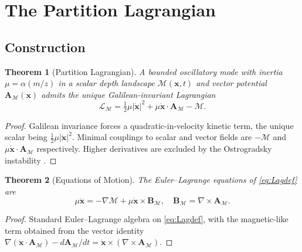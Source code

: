 \documentclass[twocolumn,10pt,a4paper]{article}
\theoremstyle{thmstyle}
\newtheorem{theorem}{Theorem}[section]
\theoremstyle{definition}
\theoremstyle{remark}
\newcommand{\Depth}{\mathcal{M}}
\newcommand{\Lagr}{\mathcal{L}}
\newcommand{\partinert}{\mu}
\newcommand{\Apartition}{\mathbf{A}_{\Depth}}
\begin{document}
\section{The Partition Lagrangian}
\label{sec:lagrangian}

\subsection{Construction}

\begin{theorem}[Partition Lagrangian]
\label{thm:Lag}
A bounded oscillatory mode with inertia $\partinert=\alpha(m/z)$ in a
scalar depth landscape $\Depth(\mathbf{x},t)$ and vector potential
$\Apartition(\mathbf{x})$ admits the unique Galilean-invariant
Lagrangian
\begin{equation}
\boxed{\;\Lagr_{\Depth}=\tfrac{1}{2}\partinert|\dot{\mathbf{x}}|^{2}
+\partinert\dot{\mathbf{x}}\cdot\Apartition-\Depth.\;}
\label{eq:Lagdef}
\end{equation}
\end{theorem}

\begin{proof}
Galilean invariance forces a quadratic-in-velocity kinetic term, the
unique scalar being $\tfrac{1}{2}\partinert|\dot{\mathbf{x}}|^{2}$.
Minimal couplings to scalar and vector fields are $-\Depth$ and
$\partinert\dot{\mathbf{x}}\cdot\Apartition$ respectively. Higher
derivatives are excluded by the Ostrogradsky instability
\citep{ostrogradsky1850}.
\end{proof}

\begin{theorem}[Equations of Motion]
\label{thm:EOM}
The Euler--Lagrange equations of \eqref{eq:Lagdef} are
\begin{equation}
\partinert\ddot{\mathbf{x}}=-\nabla\Depth
+\partinert\dot{\mathbf{x}}\times\mathbf{B}_{\Depth},
\quad
\mathbf{B}_{\Depth}=\nabla\times\Apartition.
\label{eq:EL}
\end{equation}
\end{theorem}

\begin{proof}
Standard Euler--Lagrange algebra on \eqref{eq:Lagdef}, with the
magnetic-like term obtained from the vector identity
$\nabla(\dot{\mathbf{x}}\cdot\Apartition)-d\Apartition/dt
=\dot{\mathbf{x}}\times(\nabla\times\Apartition)$.
\end{proof}
\end{document}
